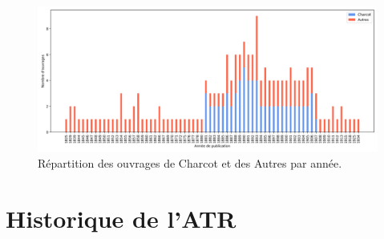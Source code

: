 \begin{figure}[h]
	\centering
	\includegraphics[width=1\textwidth]{img/distribution_ouvrages.png}
	\caption[Positionnement de l'entité \texttt{Jean-Martin Charcot} au sein de son domaine et comparaison avec les entités les plus similaires à lui \textit{via} une analyse de quadrant de l'outil Rankingdom.]{Répartition des ouvrages de Charcot et des Autres par année.}
	\label{fig:repartition_corpus}
\end{figure}


\section{Historique de l'\textsc{ATR}}